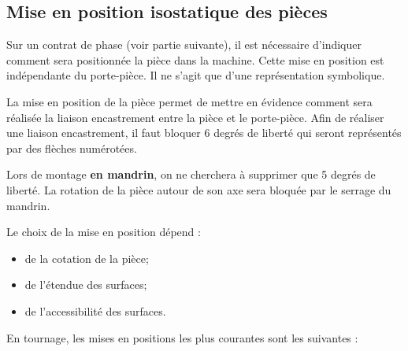 \documentclass[11pt,oneside]{article}
\begin{document}
\subsection{Mise en position isostatique des pièces}
Sur un contrat de phase (voir partie suivante), il est nécessaire d'indiquer comment sera positionnée la pièce dans la machine. Cette mise en position est indépendante du porte-pièce. Il ne s'agit que d'une représentation symbolique.

La mise en position de la pièce permet de mettre en évidence comment sera réalisée la liaison encastrement entre la pièce et le porte-pièce. Afin de réaliser une liaison encastrement, il faut bloquer 6 degrés de liberté qui seront représentés par des flèches numérotées. 

\begin{warn}
Lors de montage  \textbf{en mandrin}, on ne cherchera à supprimer que 5 degrés de liberté. La rotation de la pièce autour de son axe sera bloquée par le serrage du mandrin. 
\end{warn}

Le choix de la mise en position dépend :
\begin{itemize}
\item de la cotation de la pièce;
\item de l'étendue des surfaces;
\item de l'accessibilité des surfaces.
\end{itemize}


En tournage, les mises en positions les plus courantes sont les suivantes : 
\end{document}
